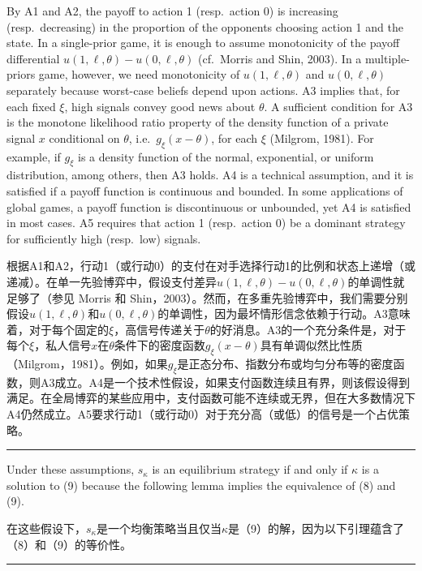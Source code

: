 \documentclass[12pt,a4paper]{article}
\newenvironment{original}
  {\par\medskip\noindent\color{black}\ignorespaces}
  {\par\medskip}
\newenvironment{translation}
  {\par\noindent\color{darkblue}\ignorespaces}
  {\par\medskip\noindent\hrule\par\medskip}
\theoremstyle{definition}
\theoremstyle{remark}
\begin{document}
\begin{original}
By A1 and A2, the payoff to action 1 (resp.\ action 0) is increasing (resp.\ decreasing) in the proportion of the opponents choosing action 1 and the state. In a single-prior game, it is enough to assume monotonicity of the payoff differential $u(1, \ell, \theta) - u(0, \ell, \theta)$ (cf.\ Morris and Shin, 2003). In a multiple-priors game, however, we need monotonicity of $u(1, \ell, \theta)$ and $u(0, \ell, \theta)$ separately because worst-case beliefs depend upon actions. A3 implies that, for each fixed $\xi$, high signals convey good news about $\theta$. A sufficient condition for A3 is the monotone likelihood ratio property of the density function of a private signal $x$ conditional on $\theta$, i.e.\ $g_\xi(x - \theta)$, for each $\xi$ (Milgrom, 1981). For example, if $g_\xi$ is a density function of the normal, exponential, or uniform distribution, among others, then A3 holds. A4 is a technical assumption, and it is satisfied if a payoff function is continuous and bounded. In some applications of global games, a payoff function is discontinuous or unbounded, yet A4 is satisfied in most cases. A5 requires that action 1 (resp.\ action 0) be a dominant strategy for sufficiently high (resp.\ low) signals.
\end{original}
\begin{translation}
根据A1和A2，行动1（或行动0）的支付在对手选择行动1的比例和状态上递增（或递减）。在单一先验博弈中，假设支付差异$u(1, \ell, \theta) - u(0, \ell, \theta)$的单调性就足够了（参见 Morris 和 Shin，2003）。然而，在多重先验博弈中，我们需要分别假设$u(1, \ell, \theta)$和$u(0, \ell, \theta)$的单调性，因为最坏情形信念依赖于行动。A3意味着，对于每个固定的$\xi$，高信号传递关于$\theta$的好消息。A3的一个充分条件是，对于每个$\xi$，私人信号$x$在$\theta$条件下的密度函数$g_\xi(x - \theta)$具有单调似然比性质（Milgrom，1981）。例如，如果$g_\xi$是正态分布、指数分布或均匀分布等的密度函数，则A3成立。A4是一个技术性假设，如果支付函数连续且有界，则该假设得到满足。在全局博弈的某些应用中，支付函数可能不连续或无界，但在大多数情况下A4仍然成立。A5要求行动1（或行动0）对于充分高（或低）的信号是一个占优策略。
\end{translation}

\begin{original}
Under these assumptions, $s_\kappa$ is an equilibrium strategy if and only if $\kappa$ is a solution to (9) because the following lemma implies the equivalence of (8) and (9).
\end{original}
\begin{translation}
在这些假设下，$s_\kappa$是一个均衡策略当且仅当$\kappa$是（9）的解，因为以下引理蕴含了（8）和（9）的等价性。
\end{translation}
\end{document}

